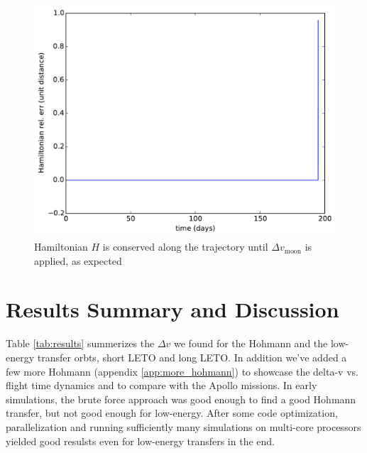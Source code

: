 \begin{figure}[ht!]
\centering
\includegraphics[scale=0.35]{fig/low-energy-long/H_low_energy_long.pdf}
\caption{Hamiltonian $H$ is conserved along the trajectory until $\Delta v_{\text{moon}}$ is applied, as expected}
\label{fig:low_energy_long-H}
\end{figure}


\section{Results Summary and Discussion}
Table \ref{tab:results} summerizes the $\Delta v$ we found for the Hohmann and the low-energy transfer orbts, short LETO and long LETO. In addition we've added a few more Hohmann (appendix \ref{app:more_hohmann}) to showcase the delta-v vs. flight time dynamics and to compare with the Apollo missions. In early simulations, the brute force approach was good enough to find a good Hohmann transfer, but not good enough for low-energy. After some code optimization, parallelization and running sufficiently many simulations on multi-core processors yielded good resulsts even for low-energy transfers in the end.

